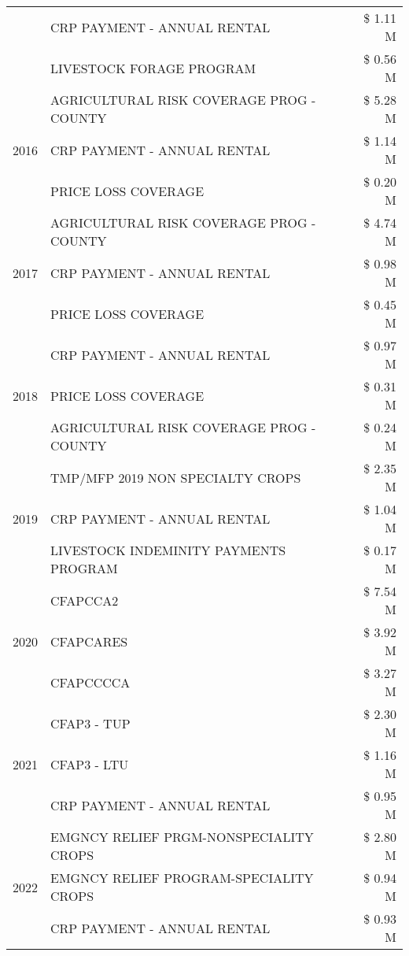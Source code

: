 \begin{tabular}{llr}
 & CRP PAYMENT - ANNUAL RENTAL & \$ 1.11 M \\
 & LIVESTOCK FORAGE PROGRAM & \$ 0.56 M \\
\cline{1-3}
\multirow[t]{3}{*}{2016} & AGRICULTURAL RISK COVERAGE PROG - COUNTY & \$ 5.28 M \\
 & CRP PAYMENT - ANNUAL RENTAL & \$ 1.14 M \\
 & PRICE LOSS COVERAGE & \$ 0.20 M \\
\cline{1-3}
\multirow[t]{3}{*}{2017} & AGRICULTURAL RISK COVERAGE PROG - COUNTY & \$ 4.74 M \\
 & CRP PAYMENT - ANNUAL RENTAL & \$ 0.98 M \\
 & PRICE LOSS COVERAGE & \$ 0.45 M \\
\cline{1-3}
\multirow[t]{3}{*}{2018} & CRP PAYMENT - ANNUAL RENTAL & \$ 0.97 M \\
 & PRICE LOSS COVERAGE & \$ 0.31 M \\
 & AGRICULTURAL RISK COVERAGE PROG - COUNTY & \$ 0.24 M \\
\cline{1-3}
\multirow[t]{3}{*}{2019} & TMP/MFP 2019 NON SPECIALTY CROPS & \$ 2.35 M \\
 & CRP PAYMENT - ANNUAL RENTAL & \$ 1.04 M \\
 & LIVESTOCK INDEMINITY PAYMENTS PROGRAM & \$ 0.17 M \\
\cline{1-3}
\multirow[t]{3}{*}{2020} & CFAPCCA2 & \$ 7.54 M \\
 & CFAPCARES & \$ 3.92 M \\
 & CFAPCCCCA & \$ 3.27 M \\
\cline{1-3}
\multirow[t]{3}{*}{2021} & CFAP3 - TUP & \$ 2.30 M \\
 & CFAP3 - LTU & \$ 1.16 M \\
 & CRP PAYMENT - ANNUAL RENTAL & \$ 0.95 M \\
\cline{1-3}
\multirow[t]{3}{*}{2022} & EMGNCY RELIEF PRGM-NONSPECIALITY CROPS & \$ 2.80 M \\
 & EMGNCY RELIEF PROGRAM-SPECIALITY CROPS & \$ 0.94 M \\
 & CRP PAYMENT - ANNUAL RENTAL & \$ 0.93 M \\
\cline{1-3}
\bottomrule
\end{tabular}
